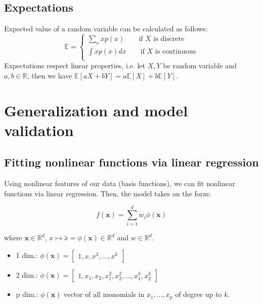 \documentclass[a4paper,10pt,twoside]{article}
\begin{document}
\subsection{Expectations}
Expected value of a random variable can be calculated as follows:
\begin{equation*}
    \mathbb{E}=\begin{cases}
        \sum_{x}xp(x)\qquad\text{if }X\text{ is discrete}\\
        \int xp(x)dx\qquad\text{if }X\text{ is continuous}\\
    \end{cases}
\end{equation*}
Expectations respect linear properties, i.e. let $X, Y$ be random variable and 
$a,b\in\mathbb{R}$, then we have $\mathbb{E}[aX+bY]=a\mathbb{E}[X]+b\mathbb{E}[Y]$.

\section{Generalization and model validation}

\subsection{Fitting nonlinear functions via linear regression}

Using nonlinear features of our data (basis functions), we can fit nonlinear functions via linear regression. Then, the model takes on the form:

\begin{equation}
    f(\mathbf{x}) = \sum_{i=1}^{d}w_i\phi(\mathbf{x})
\end{equation}

where $\mathbf{x}\in\mathbb{R}^d$, $x\mapsto \tilde{x}=\phi(\mathbf{x})\in\mathbb{R}^d$ and $w\in\mathbb{R}^d$. 
\begin{itemize}
    \item 1 dim.: $\phi(\mathbf{x})=\begin{bmatrix}
        1,x, x^2, \ldots, x^k
    \end{bmatrix}$
    \item 2 dim.: $\phi(\mathbf{x})=\begin{bmatrix}
        1,x_1, x_2, x_1^2, x_2^2, \ldots, x_1^k, x_2^k
    \end{bmatrix}$
    \item p dim.: $\phi(\mathbf{x})$ vector of all monomials in $x_1,\ldots, x_p$ of degree up to $k$.
\end{itemize}
\end{document}
